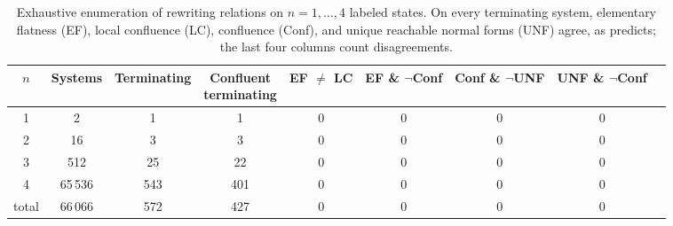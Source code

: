 \begin{table}[t]
\caption{Exhaustive enumeration of rewriting relations on $n = 1,\dots,4$ labeled states. On every terminating system, elementary flatness (EF), local confluence (LC), confluence (Conf), and unique reachable normal forms (UNF) agree, as  predicts; the last four columns count disagreements.}
\label{tab:exhaustive-finite-ars-summary}
\centering
\smallskip
\small
\setlength{\tabcolsep}{5pt}
\begin{tabular}{@{}ccccccccc@{}}
\toprule
$n$ & Systems & Terminating & \shortstack{Confluent\\terminating} & EF $\neq$ LC & \shortstack{EF \&\\$\neg$Conf} & \shortstack{Conf \&\\$\neg$UNF} & \shortstack{UNF \&\\$\neg$Conf} \\
\midrule
1 & 2 & 1 & 1 & 0 & 0 & 0 & 0 \\
2 & 16 & 3 & 3 & 0 & 0 & 0 & 0 \\
3 & 512 & 25 & 22 & 0 & 0 & 0 & 0 \\
4 & 65\,536 & 543 & 401 & 0 & 0 & 0 & 0 \\
\midrule
total & 66\,066 & 572 & 427 & 0 & 0 & 0 & 0 \\
\bottomrule
\end{tabular}
\end{table}
